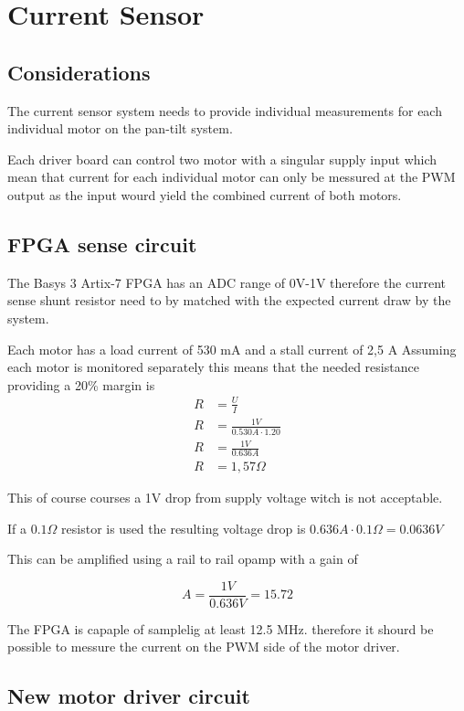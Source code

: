\documentclass[../main]{subfiles}
\begin{document}
\section*{Current Sensor}

\subsection*{Considerations}

The current sensor system needs to provide individual measurements for each individual motor on the pan-tilt system.

Each driver board can control two motor with a singular supply input which mean that current for each individual motor can only be messured at the PWM output as the input wourd yield the combined current of both motors.



\subsection*{FPGA sense circuit}

The Basys 3 Artix-7 FPGA has an ADC range of 0V-1V therefore the current sense shunt resistor need to by matched with the expected current draw by the system.

Each motor has a load current of 530 mA and a stall current of 2,5 A
Assuming each motor is monitored separately this means that the needed resistance providing a 20\% margin is
\begin{equation*}
  \begin{split}
    R&=\frac{U}{I}\\
    R&=\frac{1V}{0.530A\cdot1.20} \\
    R&=\frac{1V}{0.636A} \\
    R&=1,57\Omega
  \end{split}
\end{equation*}

This of course courses a 1V drop from supply voltage witch is not acceptable.

If a $0.1\Omega$ resistor is used the resulting voltage drop is $0.636A\cdot0.1\Omega = 0.0636V$

This can be amplified using a rail to rail opamp with a gain of

$$
A = \frac{1V}{0.636V} = 15.72
$$

The FPGA is capaple of samplelig at least 12.5 MHz. therefore it shourd be possible to messure the current on the PWM side of the motor driver.

\subsection*{New motor driver circuit}
\end{document}
